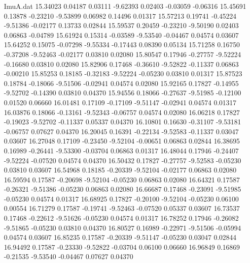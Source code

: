 \begin{filecontents}{ImuA.dat}
  15.34023    0.04187    0.03111   -9.62393    0.02403   -0.03059   -0.06316
  15.45691    0.13878   -0.23210   -9.53899    0.06982    0.14496    0.01317
  15.57213    0.19741   -0.45224   -9.51386   -0.02177    0.13733    0.02844
  15.59537    0.20459   -0.23210   -9.50190    0.02403    0.06863   -0.04789
  15.61924    0.15314   -0.03589   -9.53540   -0.04467    0.04574    0.03607
  15.64252    0.15075   -0.07298   -9.55334   -0.17443    0.08390    0.05134
  15.71258    0.16750   -0.37208   -9.52463   -0.02177    0.03810    0.02080
  15.80547    0.17946   -0.27757   -9.52224   -0.16680    0.03810    0.02080
  15.82906    0.17468   -0.36610   -9.52822   -0.11337    0.06863   -0.00210
  15.85253    0.18185   -0.32183   -9.52224   -0.05230    0.03810    0.01317
  15.87523    0.18784   -0.18066   -9.51506   -0.02941    0.04574    0.02080
  15.92165    0.17827   -0.14955   -9.52702   -0.14390    0.03810    0.04370
  15.94556    0.18066   -0.27637   -9.51985   -0.12100    0.01520    0.06660
  16.01481    0.17109   -0.17109   -9.51147   -0.02941    0.04574    0.01317
  16.03876    0.18066   -0.13161   -9.52343   -0.06757    0.04574    0.02080
  16.06218    0.17827   -0.19023   -9.52702   -0.11337    0.05337    0.04370
  16.10801    0.16630   -0.31107   -9.53181   -0.06757    0.07627    0.04370
  16.20045    0.16391   -0.22134   -9.52583   -0.11337    0.03047    0.03607
  16.27048    0.17109   -0.23450   -9.52104   -0.00651    0.06863    0.02844
  16.38695    0.16989   -0.26441   -9.53300   -0.03704    0.06863    0.01317
  16.48044    0.17946   -0.24407   -9.52224   -0.07520    0.04574    0.04370
  16.50432    0.17827   -0.27757   -9.52583   -0.05230    0.03810    0.03607
  16.54968    0.18185   -0.20339   -9.52104   -0.02177    0.06863    0.02080
  16.59594    0.17587   -0.20698   -9.52104   -0.05230    0.06863    0.02080
  16.64321    0.17587   -0.26321   -9.51386   -0.05230    0.06863    0.02080
  16.66687    0.17468   -0.23091   -9.51985   -0.05230    0.04574    0.01317
  16.68925    0.17827   -0.20100   -9.52104   -0.05230    0.06100    0.00554
  16.71279    0.17587   -0.19741   -9.52463   -0.07520    0.05337    0.03607
  16.73537    0.17468   -0.22612   -9.51626   -0.05230    0.04574    0.01317
  16.78252    0.17946   -0.26082   -9.51865   -0.05230    0.03810    0.04370
  16.80527    0.16989   -0.22971   -9.51506   -0.05994    0.04574    0.03607
  16.85235    0.17587   -0.20339   -9.51147   -0.05230    0.03047    0.02844
  16.94492    0.17587   -0.23330   -9.52822   -0.03704    0.06100    0.06660
  16.96849    0.16869   -0.21535   -9.53540   -0.04467    0.07627    0.04370

\end{filecontents}
